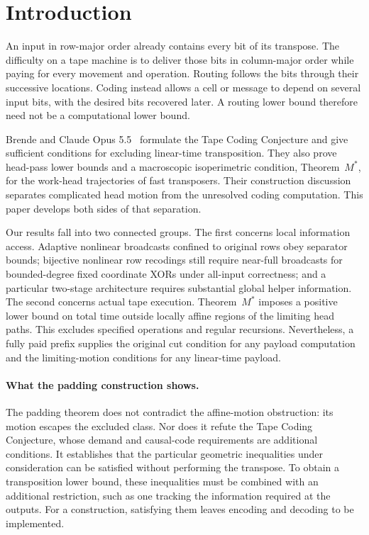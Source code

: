\section{Introduction}\label{sec:introduction}

An input in row-major order already contains every bit of its transpose.
The difficulty on a tape machine is to deliver those bits in column-major
order while paying for every movement and operation. Routing follows the bits
through their successive locations. Coding instead allows a cell or message
to depend on several input bits, with the desired bits recovered later. A
routing lower bound therefore need not be a computational lower bound.

Brende and Claude Opus 5.5~\cite{FirstPaper2026} formulate the Tape Coding
Conjecture and give sufficient conditions for excluding linear-time
transposition. They also prove head-pass lower bounds and a macroscopic
isoperimetric condition, Theorem~$M^*$, for the work-head trajectories of fast
transposers. Their construction discussion separates complicated head motion
from the unresolved coding computation. This paper develops both sides of that
separation.

Our results fall into two connected groups. The first concerns local
information access. Adaptive nonlinear broadcasts confined to original rows
obey separator bounds; bijective nonlinear row recodings still require near-full
broadcasts for bounded-degree fixed coordinate XORs under all-input correctness;
and a particular two-stage architecture
requires substantial global helper information. The second concerns actual
tape execution. Theorem~$M^*$ imposes a positive lower bound on total time
outside locally affine regions of the limiting head paths. This excludes
specified operations and
regular recursions. Nevertheless, a fully paid prefix supplies the original
cut condition for any payload computation and the limiting-motion conditions
for any linear-time payload.

\paragraph{What the padding construction shows.}
The padding theorem does not contradict the affine-motion obstruction: its
motion escapes the excluded class. Nor does it refute the Tape Coding
Conjecture, whose demand and causal-code requirements are additional
conditions. It establishes that the particular geometric inequalities under
consideration can be satisfied without performing the transpose. To obtain a transposition lower bound, these inequalities must be combined
with an additional restriction, such as one tracking the information required
at the outputs. For a construction, satisfying them leaves encoding and
decoding to be implemented.

